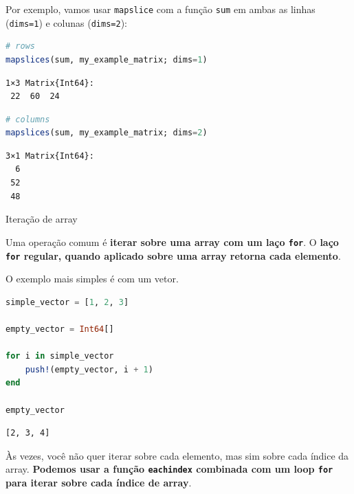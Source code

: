 \documentclass[
  notoc %
]{tufte-book}
\makeatletter
\newcommand{\passthrough}[1]{#1}
\renewcommand\subsubsection{%
\@startsection{subsubsection}{3}{\z@ }{-3.25ex\@plus -1ex \@minus -.2ex}{1.5ex \@plus .2ex}{\normalfont \normalsize \bfseries }
}
\makeatother
\begin{document}
Por exemplo, vamos usar \passthrough{\lstinline!mapslice!} com a função
\passthrough{\lstinline!sum!} em ambas as linhas
(\passthrough{\lstinline!dims=1!}) e colunas
(\passthrough{\lstinline!dims=2!}):

\begin{lstlisting}[language=Julia]
# rows
mapslices(sum, my_example_matrix; dims=1)
\end{lstlisting}

\begin{lstlisting}[language=Output]
1×3 Matrix{Int64}:
 22  60  24
\end{lstlisting}

\begin{lstlisting}[language=Julia]
# columns
mapslices(sum, my_example_matrix; dims=2)
\end{lstlisting}

\begin{lstlisting}[language=Output]
3×1 Matrix{Int64}:
  6
 52
 48
\end{lstlisting}

\hypertarget{sec:array_iteration}{%
\subsubsection{Iteração de array}\label{sec:array_iteration}}

Uma operação comum é \textbf{iterar sobre uma array com um laço
\passthrough{\lstinline!for!}}. O \textbf{laço
\passthrough{\lstinline!for!} regular, quando aplicado sobre uma array
retorna cada elemento}.

O exemplo mais simples é com um vetor.

\begin{lstlisting}[language=Julia]
simple_vector = [1, 2, 3]

empty_vector = Int64[]

for i in simple_vector
    push!(empty_vector, i + 1)
end

empty_vector
\end{lstlisting}

\begin{lstlisting}[language=Output]
[2, 3, 4]
\end{lstlisting}

Às vezes, você não quer iterar sobre cada elemento, mas sim sobre cada
índice da array. \textbf{Podemos usar a função
\passthrough{\lstinline!eachindex!} combinada com um loop
\passthrough{\lstinline!for!} para iterar sobre cada índice de array}.
\end{document}
